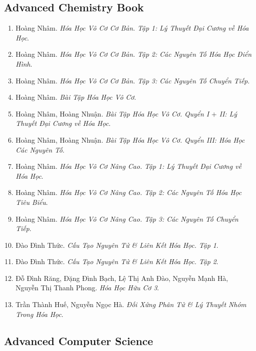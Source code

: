 \documentclass{article}
\begin{document}

\subsection{Advanced Chemistry Book}

\begin{enumerate}
	\item Hoàng Nhâm. {\it Hóa Học Vô Cơ Cơ Bản. Tập 1: Lý Thuyết Đại Cương về Hóa Học}.
	\item Hoàng Nhâm. {\it Hóa Học Vô Cơ Cơ Bản. Tập 2: Các Nguyên Tố Hóa Học Điển Hình}.
	\item Hoàng Nhâm. {\it Hóa Học Vô Cơ Cơ Bản. Tập 3: Các Nguyên Tố Chuyển Tiếp}.
	\item Hoàng Nhâm. {\it Bài Tập Hóa Học Vô Cơ}.
	\item Hoàng Nhâm, Hoàng Nhuận. {\it Bài Tập Hóa Học Vô Cơ. Quyển I $+$ II: Lý Thuyết Đại Cương về Hóa Học}.
	\item Hoàng Nhâm, Hoàng Nhuận. {\it Bài Tập Hóa Học Vô Cơ. Quyển III: Hóa Học Các Nguyên Tố}.
	\item Hoàng Nhâm. {\it Hóa Học Vô Cơ Nâng Cao. Tập 1: Lý Thuyết Đại Cương về Hóa Học}.
	\item Hoàng Nhâm. {\it Hóa Học Vô Cơ Nâng Cao. Tập 2: Các Nguyên Tố Hóa Học Tiêu Biểu}.
	\item Hoàng Nhâm. {\it Hóa Học Vô Cơ Nâng Cao. Tập 3: Các Nguyên Tố Chuyển Tiếp}.
	\item Đào Đình Thức. {\it Cấu Tạo Nguyên Tử \& Liên Kết Hóa Học. Tập 1}.
	\item Đào Đình Thức. {\it Cấu Tạo Nguyên Tử \& Liên Kết Hóa Học. Tập 2}.
	\item Đỗ Đình Răng, Đặng Đình Bạch, Lệ Thị Anh Đào, Nguyễn Mạnh Hà, Nguyễn Thị Thanh Phong. {\it Hóa Học Hữu Cơ 3}.
	\item Trần Thành Huế, Nguyễn Ngọc Hà. {\it Đối Xứng Phân Tử \& Lý Thuyết Nhóm Trong Hóa Học}.
\end{enumerate}


\subsection{Advanced Computer Science}
\end{document}
